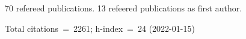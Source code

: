 70 refereed publications. 13 refeered publications as first author.

Total citations~=~2261; h-index~=~24 (2022-01-15)